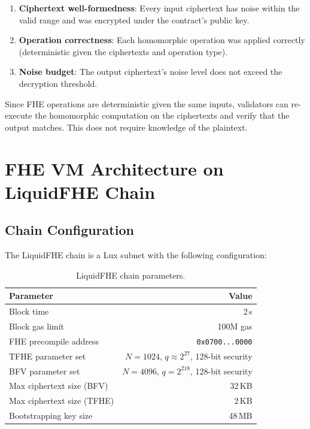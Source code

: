 \documentclass[11pt,a4paper]{article}
\begin{document}
\begin{enumerate}[leftmargin=2em]
  \item \textbf{Ciphertext well-formedness}: Every input ciphertext has noise within
        the valid range and was encrypted under the contract's public key.
  \item \textbf{Operation correctness}: Each homomorphic operation was applied
        correctly (deterministic given the ciphertexts and operation type).
  \item \textbf{Noise budget}: The output ciphertext's noise level does not exceed
        the decryption threshold.
\end{enumerate}

Since FHE operations are deterministic given the same inputs, validators can re-execute
the homomorphic computation on the ciphertexts and verify that the output matches.
This does not require knowledge of the plaintext.

\section{FHE VM Architecture on LiquidFHE Chain}
\label{sec:fhe-vm}

\subsection{Chain Configuration}

The LiquidFHE chain is a Lux subnet with the following configuration:

\begin{table}[ht]
\centering
\caption{LiquidFHE chain parameters.}
\label{tab:chain-config}
\begin{tabular}{lr}
\toprule
\textbf{Parameter} & \textbf{Value} \\
\midrule
Block time & 2\,s \\
Block gas limit & 100M gas \\
FHE precompile address & \texttt{0x0700...0000} \\
TFHE parameter set & $N = 1024$, $q \approx 2^{27}$, 128-bit security \\
BFV parameter set & $N = 4096$, $q = 2^{218}$, 128-bit security \\
Max ciphertext size (BFV) & 32\,KB \\
Max ciphertext size (TFHE) & 2\,KB \\
Bootstrapping key size & 48\,MB \\
\bottomrule
\end{tabular}
\end{table}
\end{document}

